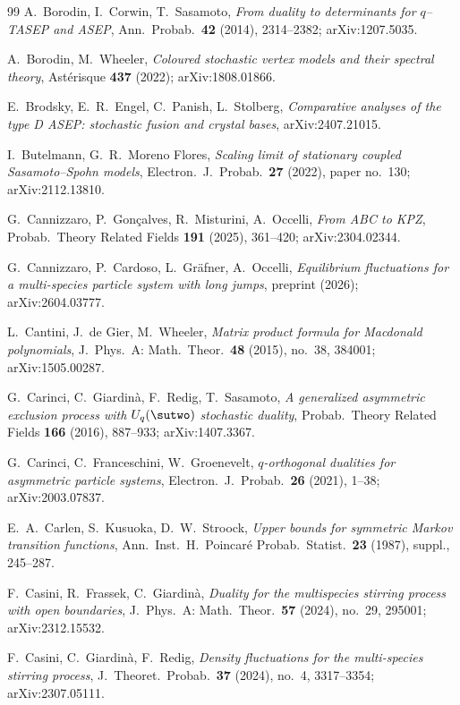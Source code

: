 \begin{thebibliography}{99}
 A.~Borodin, I.~Corwin, T.~Sasamoto, \emph{From duality to determinants for
$q$--TASEP and ASEP}, Ann.~Probab.~\textbf{42} (2014), 2314--2382; arXiv:1207.5035.

 A.~Borodin, M.~Wheeler, \emph{Coloured stochastic vertex
models and their spectral theory}, Ast\'erisque \textbf{437} (2022); arXiv:1808.01866.

 E.~Brodsky, E.~R.~Engel, C.~Panish, L.~Stolberg, \emph{Comparative
analyses of the type D ASEP: stochastic fusion and crystal bases}, arXiv:2407.21015.

 I.~Butelmann, G.~R.~Moreno Flores, \emph{Scaling limit of
stationary coupled Sasamoto--Spohn models}, Electron.~J.~Probab.~\textbf{27}
(2022), paper no.~130; arXiv:2112.13810.

 G.~Cannizzaro, P.~Gon\c{c}alves, R.~Misturini, A.~Occelli, \emph{From
ABC to KPZ}, Probab.~Theory Related Fields \textbf{191} (2025), 361--420;
arXiv:2304.02344.

 G.~Cannizzaro, P.~Cardoso, L.~Gr\"afner, A.~Occelli, \emph{Equilibrium
fluctuations for a multi-species particle system with long jumps}, preprint (2026);
arXiv:2604.03777.

 L.~Cantini, J.~de Gier, M.~Wheeler, \emph{Matrix product formula
for Macdonald polynomials}, J.~Phys.~A: Math.~Theor.~\textbf{48} (2015), no.~38,
384001; arXiv:1505.00287.

 G.~Carinci, C.~Giardin\`a, F.~Redig, T.~Sasamoto, \emph{A generalized
asymmetric exclusion process with $U_q(\sutwo)$ stochastic duality}, Probab.~Theory
Related Fields \textbf{166} (2016), 887--933; arXiv:1407.3367.

 G.~Carinci, C.~Franceschini, W.~Groenevelt, \emph{$q$-orthogonal
dualities for asymmetric particle systems}, Electron.~J.~Probab.~\textbf{26} (2021),
1--38; arXiv:2003.07837.

 E.~A.~Carlen, S.~Kusuoka, D.~W.~Stroock, \emph{Upper bounds for symmetric
Markov transition functions}, Ann.~Inst.~H.~Poincar\'e Probab.~Statist.~\textbf{23}
(1987), suppl., 245--287.

 F.~Casini, R.~Frassek, C.~Giardin\`a, \emph{Duality for the
multispecies stirring process with open boundaries}, J.~Phys.~A: Math.~Theor.~\textbf{57}
(2024), no.~29, 295001; arXiv:2312.15532.

 F.~Casini, C.~Giardin\`a, F.~Redig, \emph{Density fluctuations
for the multi-species stirring process}, J.~Theoret.~Probab.~\textbf{37} (2024),
no.~4, 3317--3354; arXiv:2307.05111.


\end{thebibliography}
